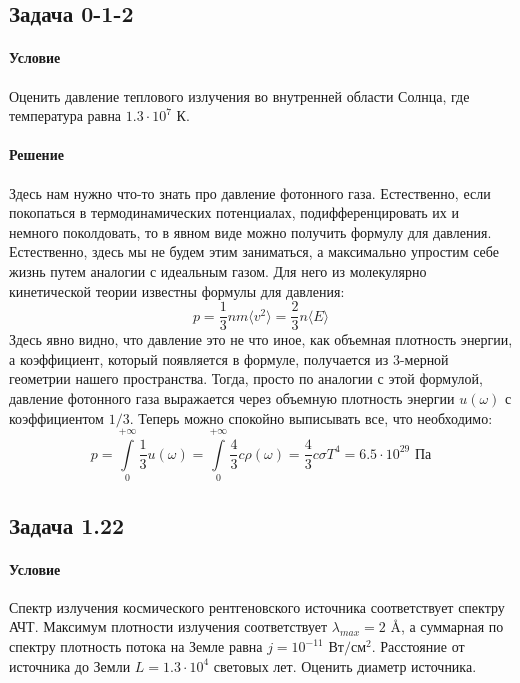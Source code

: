 \documentclass[12pt]{article}
\begin{document}
\subsection{Задача 0-1-2}
\label{task_012}
\paragraph{Условие}
Оценить давление теплового излучения во внутренней области Солнца, где температура равна $1.3\cdot 10^7$ К.
\paragraph{Решение}
Здесь нам нужно что-то знать про давление фотонного газа. Естественно,  если покопаться в термодинамических потенциалах, подифференцировать их и немного поколдовать, то в явном виде можно получить формулу для давления. Естественно, здесь мы не будем этим заниматься, а максимально упростим себе жизнь путем аналогии с идеальным газом. Для него из молекулярно кинетической теории известны формулы для давления:
\begin{equation*}
    p=\dfrac{1}{3}nm\langle v^2\rangle = \dfrac{2}{3} n \langle E \rangle
\end{equation*}
Здесь явно видно, что давление это не что иное, как объемная плотность энергии, а коэффициент, который появляется в формуле, получается из 3-мерной геометрии нашего пространства. Тогда, просто по аналогии с этой формулой, давление фотонного газа выражается через объемную плотность энергии $u(\omega)$ с коэффициентом $1/3$. Теперь можно спокойно выписывать все, что необходимо:
\begin{equation*}
    p=\int\limits_0^{+\infty}\dfrac{1}{3}u(\omega) = \int\limits_0^{+\infty}\dfrac{4}{3}c\rho(\omega) = \dfrac{4}{3}c\sigma T^4 = 6.5\cdot 10^{29} \text{ Па}
\end{equation*}
\subsection{Задача 1.22}
\label{task_122}
\paragraph{Условие}
Спектр излучения космического рентгеновского источника соответствует спектру АЧТ. Максимум плотности излучения соответствует $\lambda_{max} = 2$ \AA, а суммарная по спектру плотность потока на Земле равна $j = 10^{-11} \text{ Вт}/\text{см}^2$. Расстояние от источника до Земли $L = 1.3\cdot 10^4$ световых лет. Оценить диаметр источника. 
\end{document}
